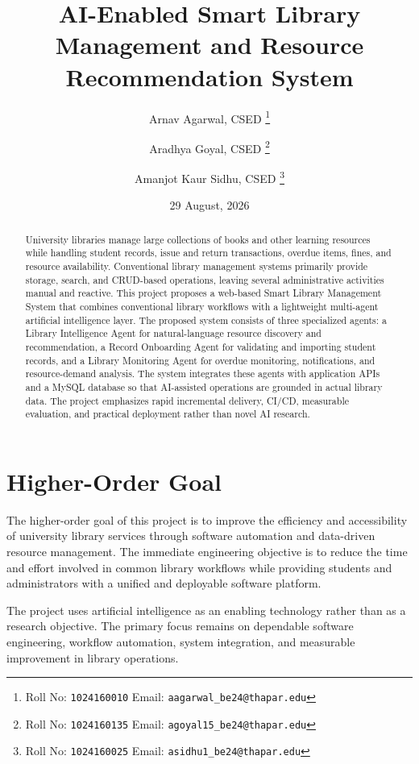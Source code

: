 \documentclass[11pt,a4paper]{article}
\title{AI-Enabled Smart Library Management and Resource Recommendation System}
\author{
  Arnav Agarwal, CSED%
  \thanks{Roll No: \texttt{1024160010} \quad Email: \texttt{aagarwal_be24@thapar.edu}}
  \and
  Aradhya Goyal, CSED%
  \thanks{Roll No: \texttt{1024160135} \quad Email: \texttt{agoyal15_be24@thapar.edu}}
  \and
  Amanjot Kaur Sidhu, CSED%
  \thanks{Roll No: \texttt{1024160025} \quad Email: \texttt{asidhu1_be24@thapar.edu}}
}
\date{29 August, 2026}
\begin{document}
\maketitle

\begin{abstract}
University libraries manage large collections of books and other learning resources while handling student records, issue and return transactions, overdue items, fines, and resource availability. Conventional library management systems primarily provide storage, search, and CRUD-based operations, leaving several administrative activities manual and reactive. This project proposes a web-based Smart Library Management System that combines conventional library workflows with a lightweight multi-agent artificial intelligence layer. The proposed system consists of three specialized agents: a Library Intelligence Agent for natural-language resource discovery and recommendation, a Record Onboarding Agent for validating and importing student records, and a Library Monitoring Agent for overdue monitoring, notifications, and resource-demand analysis. The system integrates these agents with application APIs and a MySQL database so that AI-assisted operations are grounded in actual library data. The project emphasizes rapid incremental delivery, CI/CD, measurable evaluation, and practical deployment rather than novel AI research.
\end{abstract}

\section{Higher-Order Goal}
The higher-order goal of this project is to improve the efficiency and accessibility of university library services through software automation and data-driven resource management. The immediate engineering objective is to reduce the time and effort involved in common library workflows while providing students and administrators with a unified and deployable software platform.

The project uses artificial intelligence as an enabling technology rather than as a research objective. The primary focus remains on dependable software engineering, workflow automation, system integration, and measurable improvement in library operations.
\end{document}
